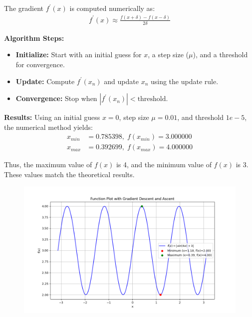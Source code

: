 \documentclass[journal]{IEEEtran}
\begin{document}
The gradient \(f^{\prime}(x)\) is computed numerically as:
\begin{align}
    f^{\prime}(x) \approx \frac{f(x + \delta) - f(x - \delta)}{2\delta}
\end{align}

\noindent \textbf{Algorithm Steps:}
\begin{itemize}
    \item \textbf{Initialize:} Start with an initial guess for \(x\), a step size (\(\mu\)), and a threshold for convergence.
    \item \textbf{Update:} Compute \(f^{\prime}(x_n)\) and update \(x_n\) using the update rule.
    \item \textbf{Convergence:} Stop when \(|f^{\prime}(x_n)| < \text{threshold}\).
\end{itemize}

\noindent \textbf{Results:}
Using an initial guess \(x = 0\), step size \(\mu = 0.01\), and threshold \(1e-5\), the numerical method yields:
\begin{align}
    x_{min} &= 0.785398, \; f(x_{min}) = 3.000000\\
    x_{max} &= 0.392699, \; f(x_{max}) = 4.000000
\end{align}

Thus, the maximum value of \(f(x)\) is 4, and the minimum value of \(f(x)\) is 3. These values match the theoretical results.

\begin{figure}[h!]
   \centering
   \includegraphics[width=0.7\columnwidth]{figs/fig.png}
\end{figure}
\end{document}
